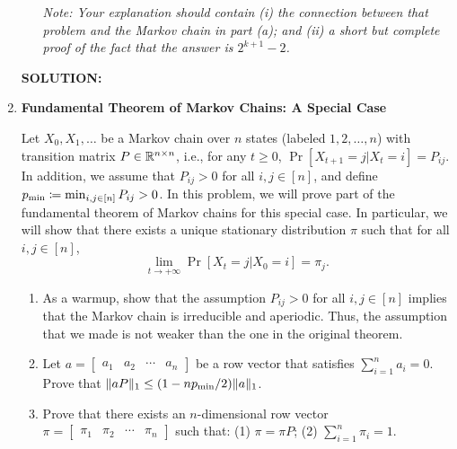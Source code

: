 \begin{enumerate}
\begin{enumerate}
\emph{Note: Your explanation should contain (i) the connection between that problem and the Markov chain in part (a); and (ii) a short but complete proof of the fact that the answer is $2^{k+1}-2$. }

\end{enumerate}

\ifdefined\template
\begin{shaded}
\textbf{SOLUTION:}
\ifdefined\sol

\fi
\end{shaded}
\fi

\item {} \textbf{Fundamental Theorem of Markov Chains: A Special Case}

Let $X_0, X_1, \ldots$ be a Markov chain over $n$ states (labeled $1, 2, \ldots, n$) with transition matrix $P \in \mathbb{R}^{n\times n}$, i.e., for any $t \ge 0$, $\Pr[X_{t+1} = j| X_t = i] = P_{ij}$. In addition, we assume that $P_{ij} > 0$ for all $i, j \in [n]$, and define $p_{\textrm{min}} \coloneqq \min_{i,j\in[n]}P_{ij} > 0$. In this problem, we will prove part of the fundamental theorem of Markov chains for this special case. In particular, we will show that there exists a unique stationary distribution $\pi$ such that for all $i, j \in [n]$,
\[
    \lim_{t\to+\infty}\Pr[X_t = j|X_0 = i] = \pi_j.
\]

\begin{enumerate}
    \item {} As a warmup, show that the assumption $P_{ij} > 0$ for all $i, j \in [n]$ implies that the Markov chain is irreducible and aperiodic. Thus, the assumption that we made is not weaker than the one in the original theorem.

    \item\label{part:1-norm}  Let $a = \begin{bmatrix}a_1 & a_2 & \cdots & a_n\end{bmatrix}$ be a row vector that satisfies $\sum_{i=1}^{n}a_i = 0$. Prove that $\|aP\|_1 \le (1 - np_{\textrm{min}} /2)\|a\|_1$.


    \item\label{part:pi}  Prove that there exists an $n$-dimensional row vector $\pi = \begin{bmatrix}\pi_1 & \pi_2 & \cdots & \pi_n\end{bmatrix}$ such that: (1) $\pi = \pi P$; (2) $\sum_{i=1}^{n}\pi_i = 1$.
    

\end{enumerate}
\end{enumerate}
